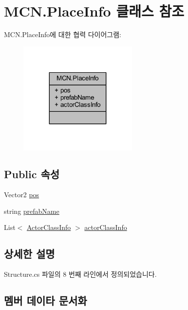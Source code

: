 \hypertarget{class_m_c_n_1_1_place_info}{}\section{M\+C\+N.\+Place\+Info 클래스 참조}
\label{class_m_c_n_1_1_place_info}


M\+C\+N.\+Place\+Info에 대한 협력 다이어그램\+:\nopagebreak
\begin{figure}[H]
\begin{center}
\leavevmode
\includegraphics[width=167pt]{class_m_c_n_1_1_place_info__coll__graph}
\end{center}
\end{figure}
\subsection*{Public 속성}
\begin{DoxyCompactItemize}
\item 
Vector2 \hyperlink{class_m_c_n_1_1_place_info_ab61c1f49a0d342fb132a2af87ee7c322}{pos}
\item 
string \hyperlink{class_m_c_n_1_1_place_info_aedf20cfad59c8298386c61bdcc266457}{prefab\+Name}
\item 
List$<$ \hyperlink{class_m_c_n_1_1_actor_class_info}{Actor\+Class\+Info} $>$ \hyperlink{class_m_c_n_1_1_place_info_a53e63fce0254eb635a1c6a302bce97d1}{actor\+Class\+Info}
\end{DoxyCompactItemize}


\subsection{상세한 설명}


Structure.\+cs 파일의 8 번째 라인에서 정의되었습니다.



\subsection{멤버 데이타 문서화}
